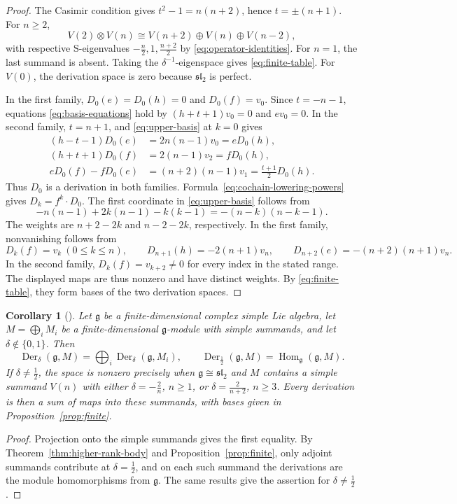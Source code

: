 \documentclass[11pt,reqno]{amsart}
\numberwithin{equation}{section}
\newcommand{\g}{\mathfrak g}
\newcommand{\s}{\mathfrak{sl}_2}
\DeclareMathOperator{\Der}{Der}
\DeclareMathOperator{\Hom}{Hom}
\newtheorem{corollary}[theorem]{Corollary}
\theoremstyle{definition}
\theoremstyle{remark}
\begin{document}
\begin{proof}
The Casimir condition gives
\(t^2-1=n(n+2)\), hence \(t=\pm(n+1)\).
For \(n\ge2\),
\[
V(2)\otimes V(n)\cong V(n+2)\oplus V(n)\oplus V(n-2),
\]
with respective \(\mathrm{S}\)-eigenvalues
\(-\frac{n}{2},1,\frac{n+2}{2}\) by \eqref{eq:operator-identities}.
For \(n=1\), the last summand is absent. Taking the
\(\delta^{-1}\)-eigenspace gives \eqref{eq:finite-table}.
For \(V(0)\), the derivation space is zero because \(\s\) is perfect.

In the first family, \(D_0(e)=D_0(h)=0\) and \(D_0(f)=v_0\).
Since \(t=-n-1\), equations \eqref{eq:basis-equations} hold by
\((h+t+1)v_0=0\) and \(ev_0=0\).
In the second family, \(t=n+1\), and \eqref{eq:upper-basis} at
\(k=0\) gives
\[
\begin{aligned}
(h-t-1)D_0(e)&=2n(n-1)v_0=eD_0(h),\\
(h+t+1)D_0(f)&=2(n-1)v_2=fD_0(h),\\
eD_0(f)-fD_0(e)&=(n+2)(n-1)v_1
=\frac{t+1}{2}D_0(h).
\end{aligned}
\]
Thus \(D_0\) is a derivation in both families.
Formula~\eqref{eq:cochain-lowering-powers} gives \(D_k=f^k\cdot D_0\).
The first coordinate in \eqref{eq:upper-basis} follows from
\[
-n(n-1)+2k(n-1)-k(k-1)=-(n-k)(n-k-1).
\]
The weights are \(n+2-2k\) and \(n-2-2k\), respectively.
In the first family, nonvanishing follows from
\[
D_k(f)=v_k\ (0\le k\le n),\qquad
D_{n+1}(h)=-2(n+1)v_n,\qquad
D_{n+2}(e)=-(n+2)(n+1)v_n.
\]
In the second family, \(D_k(f)=v_{k+2}\ne0\) for every index
in the stated range.
The displayed maps are thus nonzero and have distinct weights.
By \eqref{eq:finite-table}, they form bases of the two derivation spaces.
\end{proof}

\begin{corollary}[{\cite[Main Theorem]{ZZ21}}]\label{cor:finite-coefficients}
Let \(\g\) be a finite-dimensional complex simple Lie algebra,
let \(M=\bigoplus_i M_i\) be a finite-dimensional \(\g\)-module
with simple summands, and let \(\delta\notin\{0,1\}\). Then
\begin{equation}\label{eq:finite-coefficients}
\Der_\delta(\g,M)=\bigoplus_i\Der_\delta(\g,M_i),
\qquad
\Der_{\frac{1}{2}}(\g,M)=\Hom_\g(\g,M).
\end{equation}
If \(\delta\ne\frac{1}{2}\), the space is nonzero precisely when
\(\g\cong\s\) and \(M\) contains a simple summand \(V(n)\) with
either \(\delta=-\frac{2}{n}\), \(n\ge1\), or
\(\delta=\frac{2}{n+2}\), \(n\ge3\).
Every derivation is then a sum of maps into these summands, with
bases given in Proposition~\ref{prop:finite}.
\end{corollary}
\begin{proof}
Projection onto the simple summands gives the first equality.
By Theorem~\ref{thm:higher-rank-body} and Proposition~\ref{prop:finite},
only adjoint summands contribute at \(\delta=\frac{1}{2}\), and
on each such summand the derivations are the module homomorphisms
from \(\g\). The same results give the assertion for
\(\delta\ne\frac{1}{2}\).
\end{proof}
\end{document}
